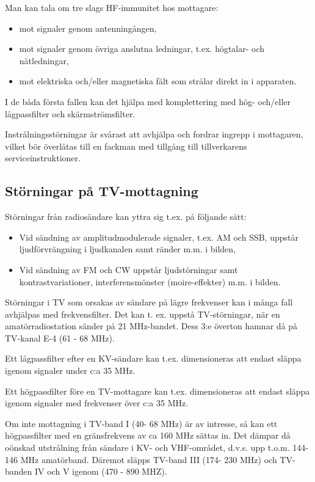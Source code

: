 Man kan tala om tre slags HF-immunitet hos mottagare:
\begin{itemize}
\item mot signaler genom antenningången,
\item mot signaler genom övriga anslutna ledningar, t.ex. högtalar-
  och nätledningar,
\item mot elektriska och/eller magnetiska fält som strålar direkt in i
  apparaten.
\end{itemize}

I de båda första fallen kan det hjälpa med komplettering med hög-
och/eller lågpassfilter och skärmströmsfilter.

Instrålningsstörningar är svårast att avhjälpa och fordrar ingrepp i
mottagaren, vilket bör överlåtas till en fackman med tillgång till
tillverkarens serviceinstruktioner.

\subsection{Störningar på TV-mottagning}


Störningar från radiosändare kan yttra sig t.ex. på följande sätt:
\begin{itemize}
\item Vid sändning av amplitudmodulerade signaler, t.ex. AM och SSB,
  uppstår ljudförvrängning i ljudkanalen samt ränder m.m. i bilden,
\item Vid sändning av FM och CW uppstår ljudstörningar samt
  kontrastvariationer, interferensmönster (moire-effekter) m.m. i
  bilden.
\end{itemize}

Störningar i TV som orsakas av sändare på lägre frekvenser kan i många
fall avhjälpas med frekvensfilter. Det kan t. ex. uppstå
TV-störningar, när en amatörradiostation sänder på 21 MHz-bandet. Dess
3:e överton hamnar då på TV-kanal E-4 (61 - 68 MHz).

Ett lågpassfilter efter en KV-sändare kan t.ex. dimensioneras att
endast släppa igenom signaler under c:a 35 MHz.

Ett högpassfilter före en TV-mottagare kan t.ex. dimensioneras att
endast släppa igenom signaler med frekvenser över c:a 35 MHz.

Om inte mottagning i TV-band I (40- 68 MHz) är av intresse, så kan ett
högpassfilter med en gränsfrekvens av ca 160 MHz sättas in. Det dämpar
då oönskad utstrålning från sändare i KV- och VHF-området, d.v.s. upp
t.o.m. 144-146 MHz amatörband. Däremot släpps TV-band III (174- 230
MHz) och TV-banden IV och V igenom (470 - 890 MHZ).


